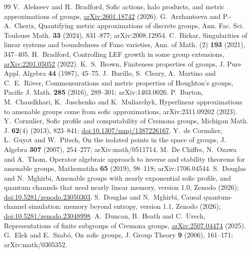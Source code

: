 \documentclass[11pt,a4paper]{article}
\theoremstyle{plain}
\theoremstyle{definition}
\theoremstyle{remark}
\begin{document}
\begin{thebibliography}{99}
 V.~Alekseev and H.~Bradford, Sofic actions, halo products, and metric approximations of groups, \href{https://arxiv.org/abs/2601.18742}{arXiv:2601.18742} (2026).
 G.~Arzhantseva and P.-A.~Cherix, Quantifying metric approximations of discrete groups, Ann. Fac. Sci. Toulouse Math. \textbf{33} (2024), 831--877; arXiv:2008.12954.
 C.~Birkar, Singularities of linear systems and boundedness of Fano varieties, Ann. of Math. (2) \textbf{193} (2021), 347--405.
 H.~Bradford, Controlling LEF growth in some group extensions, \href{https://arxiv.org/abs/2201.05052}{arXiv:2201.05052} (2022).
 K.~S.~Brown, Finiteness properties of groups, J. Pure Appl. Algebra \textbf{44} (1987), 45--75.
 J.~Burillo, S.~Cleary, A.~Martino and C.~E.~Röver, Commensurations and metric properties of Houghton's groups, Pacific J. Math. \textbf{285} (2016), 289--301; arXiv:1403.0026.
 P.~Burton, M.~Chaudkhari, K.~Juschenko and K.~Muliarchyk, Hyperlinear approximations to amenable groups come from sofic approximations, arXiv:2311.09202 (2023).
 Y.~Cornulier, Sofic profile and computability of Cremona groups, Michigan Math. J. \textbf{62}(4) (2013), 823--841; \href{https://doi.org/10.1307/mmj/1387226167}{doi:10.1307/mmj/1387226167}.
 Y.~de Cornulier, L.~Guyot and W.~Pitsch, On the isolated points in the space of groups, J. Algebra \textbf{307} (2007), 254--277; arXiv:math/0511714.
 M.~De Chiffre, N.~Ozawa and A.~Thom, Operator algebraic approach to inverse and stability theorems for amenable groups, Mathematika \textbf{65} (2019), 98--118; arXiv:1706.04544.
 S.~Douglas and N.~Mghirbi, Amenable groups with nearly exponential sofic profile, and quantum channels that
need nearly linear memory, version 1.0, Zenodo (2026); \href{https://doi.org/10.5281/zenodo.23050303}{doi:10.5281/zenodo.23050303}.
 S.~Douglas and N.~Mghirbi, Causal quantum-channel simulation: memory beyond entropy, version 1.1, Zenodo (2026); \href{https://doi.org/10.5281/zenodo.23048998}{doi:10.5281/zenodo.23048998}.
 A.~Duncan, B.~Heath and C.~Urech, Representations of finite subgroups of Cremona groups, \href{https://arxiv.org/abs/2507.04474}{arXiv:2507.04474} (2025).
 G.~Elek and E.~Szabó, On sofic groups, J. Group Theory \textbf{9} (2006), 161--171; arXiv:math/0305352.

\end{thebibliography}
\end{document}
